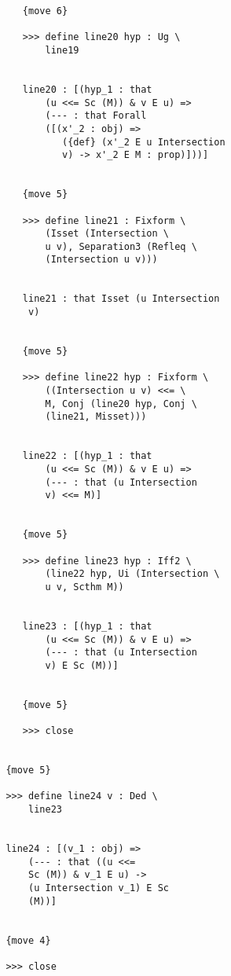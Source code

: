 \documentclass[12pt]{article}
\begin{document}
\begin{verbatim}
                  {move 6}

                  >>> define line20 hyp : Ug \
                      line19


                  line20 : [(hyp_1 : that 
                      (u <<= Sc (M)) & v E u) => 
                      (--- : that Forall 
                      ([(x'_2 : obj) => 
                         ({def} (x'_2 E u Intersection 
                         v) -> x'_2 E M : prop)]))]


                  {move 5}

                  >>> define line21 : Fixform \
                      (Isset (Intersection \
                      u v), Separation3 (Refleq \
                      (Intersection u v)))


                  line21 : that Isset (u Intersection 
                   v)


                  {move 5}

                  >>> define line22 hyp : Fixform \
                      ((Intersection u v) <<= \
                      M, Conj (line20 hyp, Conj \
                      (line21, Misset)))


                  line22 : [(hyp_1 : that 
                      (u <<= Sc (M)) & v E u) => 
                      (--- : that (u Intersection 
                      v) <<= M)]


                  {move 5}

                  >>> define line23 hyp : Iff2 \
                      (line22 hyp, Ui (Intersection \
                      u v, Scthm M))


                  line23 : [(hyp_1 : that 
                      (u <<= Sc (M)) & v E u) => 
                      (--- : that (u Intersection 
                      v) E Sc (M))]


                  {move 5}

                  >>> close


               {move 5}

               >>> define line24 v : Ded \
                   line23


               line24 : [(v_1 : obj) => 
                   (--- : that ((u <<= 
                   Sc (M)) & v_1 E u) -> 
                   (u Intersection v_1) E Sc 
                   (M))]


               {move 4}

               >>> close



\end{verbatim}
\end{document}
